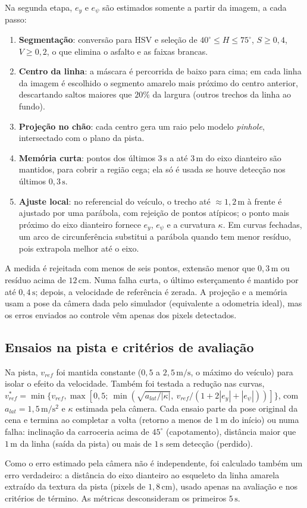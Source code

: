 Na segunda etapa, $e_y$ e $e_\psi$ são estimados somente a partir da imagem, a cada passo:
\begin{enumerate}
    \item \textbf{Segmentação}: conversão para HSV e seleção de $40^\circ\le H\le75^\circ$, $S\ge0{,}4$, $V\ge0{,}2$, o que elimina o asfalto e as faixas brancas.
    \item \textbf{Centro da linha}: a máscara é percorrida de baixo para cima; em cada linha da imagem é escolhido o segmento amarelo mais próximo do centro anterior, descartando saltos maiores que $20\%$ da largura (outros trechos da linha ao fundo).
    \item \textbf{Projeção no chão}: cada centro gera um raio pelo modelo \textit{pinhole}, intersectado com o plano da pista.
    \item \textbf{Memória curta}: pontos dos últimos $3\,\mathrm{s}$ a até $3\,\mathrm{m}$ do eixo dianteiro são mantidos, para cobrir a região cega; ela só é usada se houve detecção nos últimos $0{,}3\,\mathrm{s}$.
    \item \textbf{Ajuste local}: no referencial do veículo, o trecho até $\approx1{,}2\,\mathrm{m}$ à frente é ajustado por uma parábola, com rejeição de pontos atípicos; o ponto mais próximo do eixo dianteiro fornece $e_y$, $e_\psi$ e a curvatura $\kappa$. Em curvas fechadas, um arco de circunferência substitui a parábola quando tem menor resíduo, pois extrapola melhor até o eixo.
\end{enumerate}
A medida é rejeitada com menos de seis pontos, extensão menor que $0{,}3\,\mathrm{m}$ ou resíduo acima de $12\,\mathrm{cm}$. Numa falha curta, o último esterçamento é mantido por até $0{,}4\,\mathrm{s}$; depois, a velocidade de referência é zerada. A projeção e a memória usam a pose da câmera dada pelo simulador (equivalente a odometria ideal), mas os erros enviados ao controle vêm apenas dos pixels detectados.

\subsection{Ensaios na pista e critérios de avaliação}

Na pista, $v_{ref}$ foi mantida constante ($0{,}5$ a $2{,}5\,\mathrm{m/s}$, o máximo do veículo) para isolar o efeito da velocidade. Também foi testada a redução nas curvas, $v_{ref}^{*}=\min\{v_{ref},\max[0{,}5;\ \min(\sqrt{a_{lat}/|\kappa|},\ v_{ref}/(1+2|e_y|+|e_\psi|))]\}$, com $a_{lat}=1{,}5\,\mathrm{m/s^2}$ e $\kappa$ estimada pela câmera. Cada ensaio parte da pose original da cena e termina ao completar a volta (retorno a menos de $1\,\mathrm{m}$ do início) ou numa falha: inclinação da carroceria acima de $45^\circ$ (capotamento), distância maior que $1\,\mathrm{m}$ da linha (saída da pista) ou mais de $1\,\mathrm{s}$ sem detecção (perdido).

Como o erro estimado pela câmera não é independente, foi calculado também um erro verdadeiro: a distância do eixo dianteiro ao esqueleto da linha amarela extraído da textura da pista (pixels de $1{,}8\,\mathrm{cm}$), usado apenas na avaliação e nos critérios de término. As métricas desconsideram os primeiros $5\,\mathrm{s}$.
